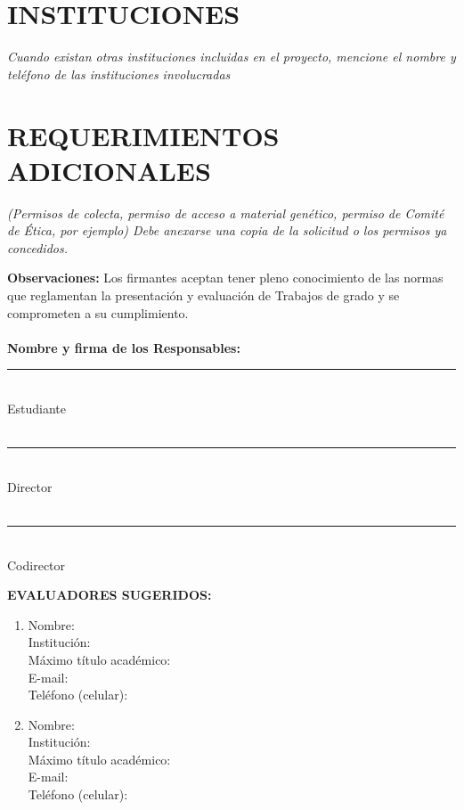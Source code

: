 \documentclass[12pt,letterpaper]{article}
\begin{document}
\section{INSTITUCIONES}
\emph{ Cuando existan otras instituciones incluidas en el proyecto, mencione el nombre y teléfono de las instituciones involucradas}

\section{REQUERIMIENTOS ADICIONALES}
\emph{(Permisos de colecta, permiso de acceso a material genético, permiso de Comité de Ética, por ejemplo) Debe anexarse una copia de la solicitud o los permisos ya concedidos.}

\newpage

\textbf{Observaciones:} Los firmantes aceptan tener pleno conocimiento de las normas que reglamentan la presentación y evaluación de Trabajos de grado y se comprometen a su cumplimiento.\\
\\
\textbf{Nombre y firma de los Responsables:}
\vspace{1 cm}\\
\noindent\rule{5cm}{0.4pt}\\
Estudiante\\
\vspace{2 pt}\\
\noindent\rule{5cm}{0.4pt}\\
Director\\
\vspace{2 pt}\\
\noindent\rule{5cm}{0.4pt}\\
Codirector\\

\begin{framed}
\textbf{EVALUADORES SUGERIDOS:}
\begin{enumerate}
\item Nombre:\\
Institución:\\
Máximo título académico:\\
E-mail:\\
Teléfono (celular):\\

\item Nombre:\\
Institución:\\
Máximo título académico:\\
E-mail:\\
Teléfono (celular):\\
\end{enumerate}
\end{framed}
\end{document}
